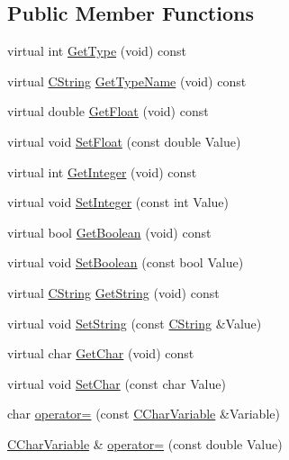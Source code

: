 \subsection*{Public Member Functions}
\begin{DoxyCompactItemize}
\item 
virtual int \hyperlink{classCCharVariable_affc9e6d08fd02a634051d1f93a17daae}{Get\-Type} (void) const 
\item 
virtual \hyperlink{classCString}{C\-String} \hyperlink{classCCharVariable_a074d079d84d374fd3e5ad5450481dbd4}{Get\-Type\-Name} (void) const 
\item 
virtual double \hyperlink{classCCharVariable_ac99bc24b9317a3dfbcca74323a501b34}{Get\-Float} (void) const 
\item 
virtual void \hyperlink{classCCharVariable_aba3a833cbd4d2e135c30f6057cb7b925}{Set\-Float} (const double Value)
\item 
virtual int \hyperlink{classCCharVariable_a2fa1f3606008449057020fe408cfb14b}{Get\-Integer} (void) const 
\item 
virtual void \hyperlink{classCCharVariable_a2c09cdde57df25e1ea9b05a024e88351}{Set\-Integer} (const int Value)
\item 
virtual bool \hyperlink{classCCharVariable_ac84ca3b9594858ac0fed4dde57388e85}{Get\-Boolean} (void) const 
\item 
virtual void \hyperlink{classCCharVariable_a3a5d6e88ed9281e6d8c6833826266398}{Set\-Boolean} (const bool Value)
\item 
virtual \hyperlink{classCString}{C\-String} \hyperlink{classCCharVariable_aedfd33f26e2e746e2631e9267e602e3a}{Get\-String} (void) const 
\item 
virtual void \hyperlink{classCCharVariable_a534d79a4b878a3c6fe13d6681b27eed3}{Set\-String} (const \hyperlink{classCString}{C\-String} \&Value)
\item 
virtual char \hyperlink{classCCharVariable_a8f9dab783a2dd3ca945b614d5338cfa5}{Get\-Char} (void) const 
\item 
virtual void \hyperlink{classCCharVariable_acd18202ed2d51ae71c61825a70aed8f6}{Set\-Char} (const char Value)
\item 
char \hyperlink{classCCharVariable_a925186465e82d1e4176e71d0570eb78f}{operator=} (const \hyperlink{classCCharVariable}{C\-Char\-Variable} \&Variable)
\item 
\hyperlink{classCCharVariable}{C\-Char\-Variable} \& \hyperlink{classCCharVariable_a62299b37fe7af7a738ad7560def8af11}{operator=} (const double Value)

\end{DoxyCompactItemize}
